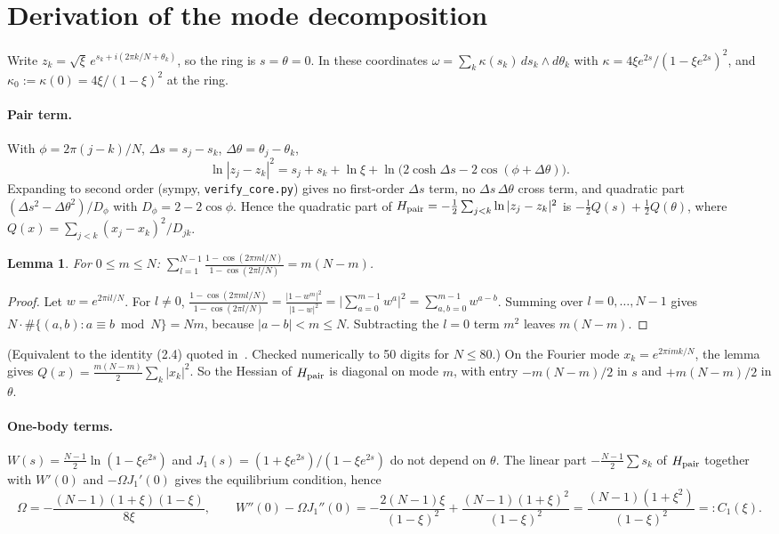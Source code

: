 \documentclass[11pt]{article}
\newtheorem{lemma}[theorem]{Lemma}
\theoremstyle{remark}
\begin{document}
\section{Derivation of the mode decomposition}
Write $z_k=\sqrt{\xi}\,e^{s_k+i(2\pi k/N+\theta_k)}$, so the ring is $s=\theta=0$. In these coordinates
$\omega=\sum_k\kappa(s_k)\,ds_k\wedge d\theta_k$ with $\kappa=4\xi e^{2s}/(1-\xi e^{2s})^2$, and
$\kappa_0:=\kappa(0)=4\xi/(1-\xi)^2$ at the ring.

\paragraph{Pair term.} With $\phi=2\pi(j-k)/N$, $\Delta s=s_j-s_k$, $\Delta\theta=\theta_j-\theta_k$,
\[
\ln|z_j-z_k|^2=s_j+s_k+\ln\xi+\ln\!\big(2\cosh\Delta s-2\cos(\phi+\Delta\theta)\big).
\]
Expanding to second order (sympy, \texttt{verify\_core.py}) gives no first-order $\Delta s$ term, no
$\Delta s\,\Delta\theta$ cross term, and quadratic part $(\Delta s^2-\Delta\theta^2)/D_\phi$ with
$D_\phi=2-2\cos\phi$. Hence the quadratic part of $H_{\rm pair}=-\frac12\sum_{j<k}\ln|z_j-z_k|^2$ is
$-\tfrac12 Q(s)+\tfrac12 Q(\theta)$, where $Q(x)=\sum_{j<k}(x_j-x_k)^2/D_{jk}$.

\begin{lemma}\label{fejer}
For $0\le m\le N$: $\displaystyle\sum_{l=1}^{N-1}\frac{1-\cos(2\pi ml/N)}{1-\cos(2\pi l/N)}=m(N-m)$.
\end{lemma}
\begin{proof}
Let $w=e^{2\pi il/N}$. For $l\ne0$, $\frac{1-\cos(2\pi ml/N)}{1-\cos(2\pi l/N)}=\frac{|1-w^m|^2}{|1-w|^2}
=\big|\sum_{a=0}^{m-1}w^a\big|^2=\sum_{a,b=0}^{m-1}w^{a-b}$. Summing over $l=0,\dots,N-1$ gives
$N\cdot\#\{(a,b):a\equiv b\bmod N\}=Nm$, because $|a-b|<m\le N$. Subtracting the $l=0$ term $m^2$ leaves
$m(N-m)$.
\end{proof}
(Equivalent to the identity (2.4) quoted in~\cite{MT}. Checked numerically to 50 digits for $N\le80$.)
On the Fourier mode $x_k=e^{2\pi imk/N}$, the lemma gives $Q(x)=\frac{m(N-m)}{2}\sum_k|x_k|^2$. So the
Hessian of $H_{\rm pair}$ is diagonal on mode $m$, with entry $-m(N-m)/2$ in $s$ and $+m(N-m)/2$ in $\theta$.

\paragraph{One-body terms.} $W(s)=\frac{N-1}2\ln(1-\xi e^{2s})$ and
$J_1(s)=(1+\xi e^{2s})/(1-\xi e^{2s})$ do not depend on $\theta$. The linear part $-\frac{N-1}{2}\sum s_k$ of
$H_{\rm pair}$ together with $W'(0)$ and $-\Omega J_1'(0)$ gives the equilibrium condition, hence
\[
\Omega=-\frac{(N-1)(1+\xi)(1-\xi)}{8\xi},\qquad
W''(0)-\Omega J_1''(0)=-\frac{2(N-1)\xi}{(1-\xi)^2}+\frac{(N-1)(1+\xi)^2}{(1-\xi)^2}
=\frac{(N-1)(1+\xi^2)}{(1-\xi)^2}=:C_1(\xi).
\]
\end{document}
